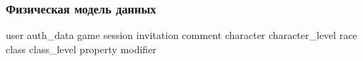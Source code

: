 \subsubsection{Физическая модель данных}

{user}
{auth_data}
{game}
{session}
{invitation}
{comment}
{character}
{character_level}
{race}
{class}
{class_level}
{property}
{modifier}

\emptyString
